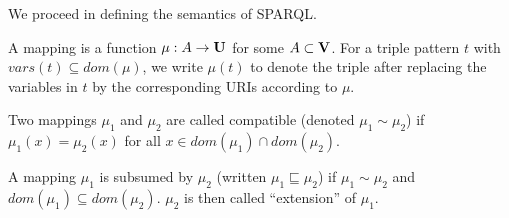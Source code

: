 We proceed in defining the semantics of SPARQL. 

\begin{definition}\label{def:sparqlsem}
	A mapping is a function $\mu: A \rightarrow  \mathbf{U}$ for some $A \subset \mathbf{V}$. 
	For a triple pattern $t$ with $vars(t) \subseteq dom(\mu)$, we write $\mu(t)$ to 
	denote the triple after replacing the variables in $t$ by the corresponding 
	URIs according to $\mu$. 

	\noindent Two mappings $\mu_1$ and $\mu_2$ are called compatible (denoted $\mu_1 \sim \mu_2$) 
	if $\mu_1(x) = \mu_2(x)$ for all $x \in dom(\mu_1) \cap dom(\mu_2)$.

	\noindent A mapping $\mu_1$ is subsumed by $\mu_2$ (written $\mu_1 \sqsubseteq \mu_2$) 
	if $\mu_1 \sim \mu_2$ and $dom(\mu_1) \subseteq dom(\mu_2)$. $\mu_2$ is then called ``extension'' of $\mu_1$.


\end{definition}
